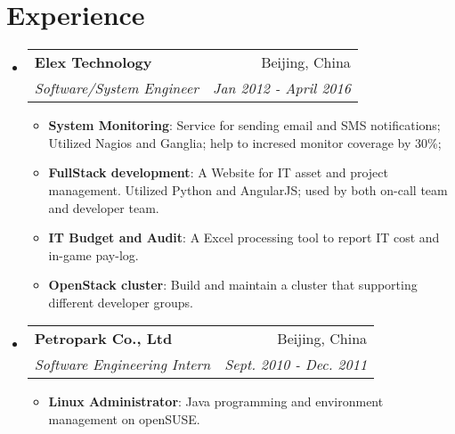 \documentclass[letterpaper,12pt]{article}
\makeatletter
\newcommand{\resumeItem}[2]{
  \item\small{
    \textbf{#1}{: #2 \vspace{-2pt}}
  }
}
\newcommand{\resumeSubheading}[4]{
  \vspace{-1pt}\item
    \begin{tabular*}{0.97\textwidth}[t]{l@{\extracolsep{\fill}}r}
      \textbf{#1} & #2 \\
      \textit{\small#3} & \textit{\small #4} \\
    \end{tabular*}\vspace{-5pt}
}
\newcommand{\resumeSubSubheading}[2]{
    \begin{tabular*}{0.97\textwidth}{l@{\extracolsep{\fill}}r}
      \textit{\small#1} & \textit{\small #2} \\
    \end{tabular*}\vspace{-5pt}
}
\newcommand{\resumeSubHeadingListStart}{\begin{itemize}[leftmargin=*]}
\newcommand{\resumeSubHeadingListEnd}{\end{itemize}}
\newcommand{\resumeItemListStart}{\begin{itemize}}
\newcommand{\resumeItemListEnd}{\end{itemize}\vspace{-5pt}}
\makeatother
\begin{document}
\section{Experience}
  \resumeSubHeadingListStart

      

    \resumeSubheading
      {Elex Technology}{Beijing, China}
      {Software/System Engineer}{Jan 2012 - April 2016}
      \resumeItemListStart
        \resumeItem{System Monitoring}{Service for sending email and SMS notifications; Utilized Nagios and Ganglia; help to incresed monitor coverage by 30\%;}
        \resumeItem{FullStack development}{A Website for IT asset and project management. Utilized Python and AngularJS; used by both on-call team and developer team.}
        \resumeItem{IT Budget and Audit}{A Excel processing tool to report IT cost and in-game pay-log.}
        \resumeItem{OpenStack cluster}{Build and maintain a cluster that supporting different developer groups.}
      \resumeItemListEnd

    \resumeSubheading
      { Petropark Co., Ltd}{Beijing, China}
      {Software Engineering Intern}{Sept. 2010 - Dec. 2011}
      \resumeItemListStart
        \resumeItem{Linux Administrator}{Java programming and environment management on openSUSE.}
      \resumeItemListEnd

  \resumeSubHeadingListEnd


\end{document}
